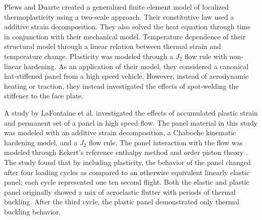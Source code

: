 \documentclass[conf]{new-aiaa}
\begin{document}
Plews and Duarte
\cite{plews_a_two_scale_generalized_finite_element_approach_for_modeling_localized_thermoplasticity}
created a generalized finite element model of localized 
thermoplasticity using a two-scale approach. 
Their constitutive law used a additive strain decomposition. 
They also solved the heat equation through time
in conjunction with their mechanical model. 
Temperature dependence of their structural model through 
a linear relation between thermal strain and temperature change. 
Plasticity was modeled through a $J_2$ flow rule with 
non-linear hardening.
As an application of their model, they considered a canonical 
hat-stiffened panel from a high speed vehicle. 
However, instead of aerodynamic heating or traction, 
they instead investigated the effects of spot-welding 
the stiffener to the face plate. 

A study by LaFontaine et al.
\cite{
  lafontaine_effects_of_strain_hardeing_on_response_of_skin_panels_in_hypersonic_flow}
investigated the effects of accumulated 
plastic strain and permanent set of a panel in high speed flow.
The panel material in this study was modeled with an additive 
strain decomposition, a Chaboche kinematic hardening model,
and a $J_2$ flow rule. 
The panel interaction with the flow was modeled through
Eckert's reference enthalpy method 
\cite{
  eckert_engineering_relations_for_heat_transfer_and_friction_in_high_velocity_laminar_and_turbulent_flow}
and  order piston theory
\cite{
  meijer_generalized_formulation_and_review_of_piston_theory_for_airfoils}.
The study found that by including plasticity, 
the behavior of the panel changed after four loading cycles 
as compared to an otherwise equivalent linearly elastic panel;
each cycle represented one ten second flight.
Both the elastic and plastic panel originally showed a mix of 
aeroelastic flutter with periods of thermal buckling. 
After the third cycle, the plastic panel demonstrated only thermal
buckling behavior.
\end{document}
